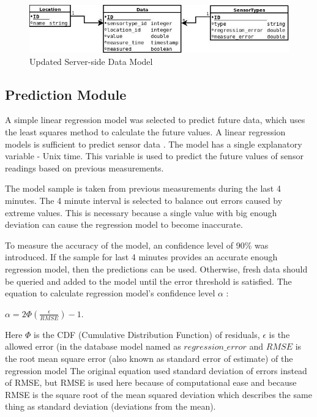 \begin{figure}[h!]
\centering
\includegraphics[scale=0.6]{4/figures/data_model_final.jpg}
\caption{Updated Server-side Data Model}
\label{data_model_final}
\end{figure}

\subsection{Prediction Module}

A simple linear regression model was selected to predict future data, which uses the least squares method to calculate the future values. A linear regression models is sufficient to predict sensor data \cite[p. 1066]{cluster_wsn_paper}. The model has a single explanatory variable - Unix time. This variable is used to predict the future values of sensor readings based on previous measurements. 

The model sample is taken from previous measurements during the last 4 minutes. The 4 minute interval is selected to balance out errors caused by extreme values. This is necessary because a single value with big enough deviation can cause the regression model to become inaccurate. 

To measure the accuracy of the model, an confidence level of 90\% was introduced. If the sample for last 4 minutes provides an accurate enough regression model, then the predictions can be used. Otherwise, fresh data should be queried and added to the model until the error threshold is satisfied. The equation to calculate regression model's confidence level $\alpha$ \cite[p. 1066]{cluster_wsn_paper}:\\

\begin{center}
$\alpha = 2\Phi \left ( \frac{\epsilon}{RMSE}  \right ) - 1$.
\end{center}

Here $\Phi$ is the CDF (Cumulative Distribution Function) of residuals, $\epsilon$ is the allowed error (in the database model named as $regression\_error$ and $RMSE$ is the root mean square error (also known as standard error of estimate) of the regression model The original equation used standard deviation of errors instead of RMSE, but RMSE is used here because of computational ease and because RMSE is the square root of the mean squared deviation \cite{RMSE} which describes the same thing as standard deviation (deviations from the mean). 

